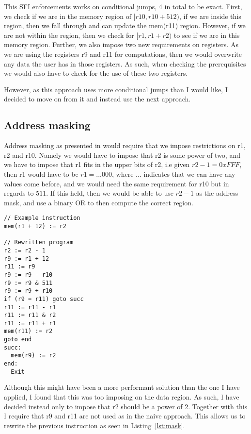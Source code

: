 This SFI enforcements works on conditional jumps, 4 in total to be exact. First,
we check if we are in the memory region of $[r10, r10 + 512)$, if we are inside
this region, then we fall through and can update the mem(r11) region. However,
if we are not within the region, then we check for $[r1, r1+r2)$ to see if we
are in this memory region. Further, we also impose two new requirements on
registers. As we are using the registers r9 and r11 for computations, then we
would overwrite any data the user has in those registers. As such, when
checking the prerequisites we would also have to check for the use of these two
registers.

However, as this approach uses more conditional jumps than I would like, I
decided to move on from it and instead use the next approach.

\subsection{Address masking}\label{sec:address}
Address masking as presented in \cite{SFI} would require that we impose
restrictions on r1, r2 and r10. Namely we would have to impose that r2 is some
power of two, and we have to impose that r1 fits in the upper bits of r2, i.e
given $r2 - 1 = 0xFFF$, then r1 would have to be $r1=...000$, where ...
indicates that we can have any values come before, and we would need the same
requirement for r10 but in regards to $511$. If this held, then we would be
able to use $r2-1$ as the address mask, and use a binary OR to then compute the
correct region.

\begin{lstlisting}[caption={Example program}, label={lst:mask}, mathescape=true]
// Example instruction
mem(r1 + 12) := r2

// Rewritten program
r2 := r2 - 1
r9 := r1 + 12
r11 := r9
r9 := r9 - r10
r9 := r9 & 511
r9 := r9 + r10
if (r9 = r11) goto succ
r11 := r11 - r1
r11 := r11 & r2
r11 := r11 + r1
mem(r11) := r2
goto end
succ:
  mem(r9) := r2
end:
  Exit
\end{lstlisting}

Although this might have been a more performant solution than the one I have
applied, I found that this was too imposing on the data region. As such, I have
decided instead only to impose that r2 should be a power of 2. Together with
this I require that r9 and r11 are not used as in the naive approach. This
allows us to rewrite the previous instruction as seen in Listing~\ref{lst:mask}.

